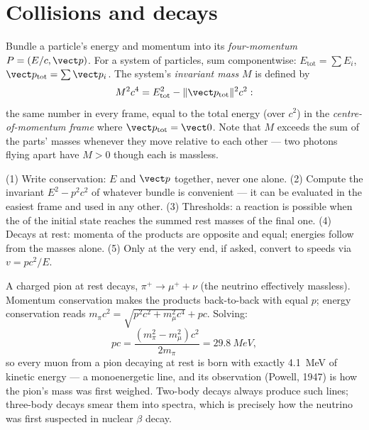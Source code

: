 \section{Collisions and decays}

\begin{definition}\label{def:b3:relativistic-dynamics:four-momentum}
Bundle a particle's energy and momentum into its \emph{four-momentum}
$P = (E/c, \vect p)$. For a system of particles, sum componentwise:
$E_{\text{tot}} = \sum E_i$, $\vect p_{\text{tot}} = \sum\vect p_i$.
The system's \emph{invariant mass} $M$ is defined by
\[
M^2c^4 = E_{\text{tot}}^2 - \|\vect p_{\text{tot}}\|^2c^2 :
\]
the same number in every frame, equal to the total energy (over
$c^2$) in the \emph{centre-of-momentum frame} where
$\vect p_{\text{tot}} = \vect 0$. Note that $M$ exceeds the sum of
the parts' masses whenever they move relative to each other --- two
photons flying apart have $M > 0$ though each is massless.
\end{definition}

\begin{method}\label{met:b3:relativistic-dynamics:method}
(1) Write  conservation: $E$ and $\vect p$ together,
never one alone. (2) Compute the invariant $E^2 - p^2c^2$ of
whatever bundle is convenient --- it can be evaluated in the easiest
frame and used in any other. (3) Thresholds: a reaction is possible
when the  of the initial state reaches the summed rest
masses of the final one. (4) Decays at rest: momenta of the products
are opposite and equal; energies follow from the masses alone. (5)
Only at the very end, if asked, convert to speeds via $v = pc^2/E$.
\end{method}

\begin{example}\label{ex:b3:relativistic-dynamics:pion}
A charged pion at rest decays, $\pi^+ \to \mu^+ + \nu$ (the neutrino
effectively massless). Momentum conservation makes the products
back-to-back with equal $p$; energy conservation reads $m_\pi c^2 =
\sqrt{p^2c^2 + m_\mu^2c^4} + pc$. Solving:
\[
pc = \frac{(m_\pi^2 - m_\mu^2)c^2}{2m_\pi} = \qty{29.8}{MeV} ,
\]
so every muon from a pion decaying at rest is born with exactly
\qty{4.1}{MeV} of kinetic energy --- a monoenergetic line, and its
observation (Powell, 1947) is how the pion's mass was first weighed.
Two-body decays always produce such lines; three-body decays smear
them into spectra, which is precisely how the neutrino was first
suspected in nuclear $\beta$ decay.
\end{example}

